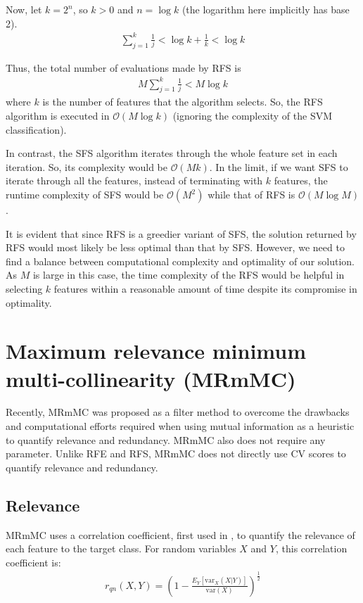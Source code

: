 \documentclass[12pt, twoside, a4paper]{report}
\def\var{\text{var}}
\begin{document}
Now, let $k=2^n$, so $k>0$ and $n=\log k$ (the logarithm here implicitly has base 2).
\begin{align*}
\sum_{j=1}^k \frac{1}{j} < \log k+ \frac{1}{k} < \log k
\end{align*}

Thus, the total number of evaluations made by RFS is
\begin{align*}
M \sum_{j=1}^k \frac{1}{j} < M \log k
\end{align*}
where $k$ is the number of features that the algorithm selects. So, the RFS algorithm is executed in $\mathcal{O}(M\log k)$ (ignoring the complexity of the SVM classification).

In contrast, the SFS algorithm iterates through the whole feature set in each iteration. So, its complexity would be $\mathcal{O}(Mk)$. In the limit, if we want SFS to iterate through all the features, instead of terminating with $k$ features, the runtime complexity of SFS would be $\mathcal{O}(M^2)$ while that of RFS is $\mathcal{O}(M\log M)$.

It is evident that since RFS is a greedier variant  of SFS, the solution returned by RFS would most likely be less optimal than that by SFS. However, we need to find a balance between computational complexity and optimality of our solution. As $M$ is large in this case, the time complexity of the RFS would be helpful in selecting $k$ features within a reasonable amount of time despite its compromise in optimality.


\section{Maximum relevance minimum multi-collinearity (MRmMC)} \label{mrmmc}

Recently, MRmMC \cite{RefWorks:187} was proposed as a filter method to overcome the drawbacks and computational efforts required when using mutual information as a heuristic to quantify relevance and redundancy. MRmMC also does not require any parameter. Unlike RFE and RFS, MRmMC does not directly use CV scores to quantify relevance and redundancy. 


\subsection{Relevance}

MRmMC uses a correlation coefficient, first used in \cite{RefWorks:188}, to quantify the relevance of each feature to the target class. For random variables $X$ and $Y$, this correlation coefficient is:
\begin{align*}
r_{qn}(X, Y) = \left( 1 - \frac{E_Y[\var_X(X|Y)]}{\var(X)} \right)^{\frac{1}{2}}
\end{align*}
\end{document}
